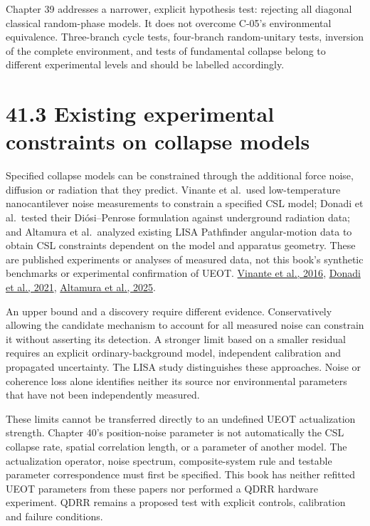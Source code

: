 \documentclass[
  11pt,
  oneside]{book}
\begin{document}
Chapter 39 addresses a narrower, explicit hypothesis test: rejecting all
diagonal classical random-phase models. It does not overcome C-05's
environmental equivalence. Three-branch cycle tests, four-branch
random-unitary tests, inversion of the complete environment, and tests
of fundamental collapse belong to different experimental levels and
should be labelled accordingly.

\section{41.3 Existing experimental constraints on collapse models}

Specified collapse models can be constrained through the additional
force noise, diffusion or radiation that they predict. Vinante et
al.~used low-temperature nanocantilever noise measurements to constrain
a specified CSL model; Donadi et al.~tested their Diósi--Penrose
formulation against underground radiation data; and Altamura et
al.~analyzed existing LISA Pathfinder angular-motion data to obtain CSL
constraints dependent on the model and apparatus geometry. These are
published experiments or analyses of measured data, not this book's
synthetic benchmarks or experimental confirmation of UEOT.
\href{https://doi.org/10.1103/PhysRevLett.116.090402}{Vinante et al.,
2016}, \href{https://doi.org/10.1038/s41567-020-1008-4}{Donadi et al.,
2021}, \href{https://doi.org/10.1103/PhysRevA.111.L020203}{Altamura et
al., 2025}.

An upper bound and a discovery require different evidence.
Conservatively allowing the candidate mechanism to account for all
measured noise can constrain it without asserting its detection. A
stronger limit based on a smaller residual requires an explicit
ordinary-background model, independent calibration and propagated
uncertainty. The LISA study distinguishes these approaches. Noise or
coherence loss alone identifies neither its source nor environmental
parameters that have not been independently measured.

These limits cannot be transferred directly to an undefined UEOT
actualization strength. Chapter 40's position-noise parameter is not
automatically the CSL collapse rate, spatial correlation length, or a
parameter of another model. The actualization operator, noise spectrum,
composite-system rule and testable parameter correspondence must first
be specified. This book has neither refitted UEOT parameters from these
papers nor performed a QDRR hardware experiment. QDRR remains a proposed
test with explicit controls, calibration and failure conditions.
\end{document}

